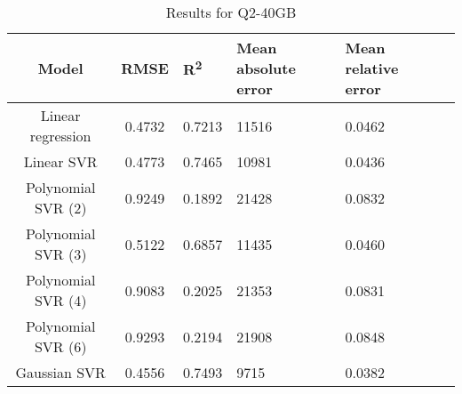 \begin{table}[H]
\centering
\begin{adjustbox}{center}
\begin{tabular}{c | c M{1.2cm} M{2.5cm} M{2.5cm} M{1.8cm}}
Model & RMSE & R\textsuperscript{2} & Mean absolute error & Mean relative error \tabularnewline
\hline
Linear regression & 0.4732 & 0.7213 &  11516 & 0.0462 \\
Linear SVR & 0.4773 & 0.7465 &  10981 & 0.0436 \\
Polynomial SVR (2) & 0.9249 & 0.1892 &  21428 & 0.0832 \\
Polynomial SVR (3) & 0.5122 & 0.6857 &  11435 & 0.0460 \\
Polynomial SVR (4) & 0.9083 & 0.2025 &  21353 & 0.0831 \\
Polynomial SVR (6) & 0.9293 & 0.2194 &  21908 & 0.0848 \\
Gaussian SVR & 0.4556 & 0.7493 &   9715 & 0.0382 \\
\end{tabular}
\end{adjustbox}
\\
\caption{Results for Q2-40GB}
\label{tab:all_linear_Q2_40}
\end{table}
